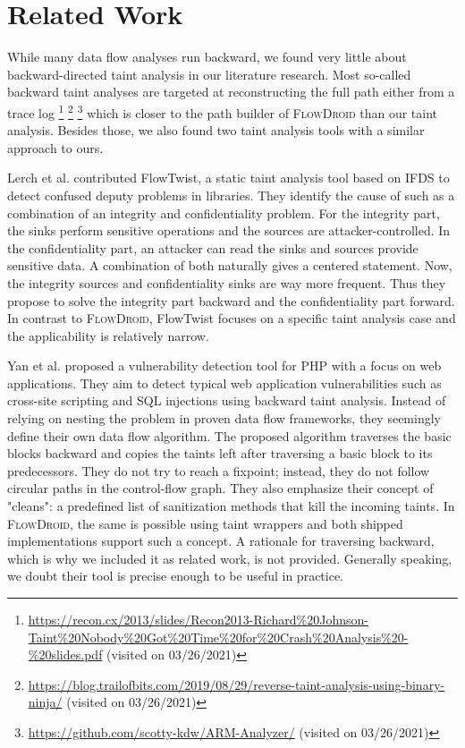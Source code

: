 \documentclass[../draft.tex]{subfiles}
\begin{document}
    \chapter{Related Work}
    While many data flow analyses run backward, we found very little about backward-directed taint analysis in our literature research. 
    Most so-called backward taint analyses are targeted at reconstructing the full path either from a trace log%
    \footnote{\url{https://recon.cx/2013/slides/Recon2013-Richard\%20Johnson-Taint\%20Nobody\%20Got\%20Time\%20for\%20Crash\%20Analysis\%20-\%20slides.pdf} (visited on 03/26/2021)}%
    \footnote{\url{https://blog.trailofbits.com/2019/08/29/reverse-taint-analysis-using-binary-ninja/} (visited on 03/26/2021)}%
    \footnote{\url{https://github.com/scotty-kdw/ARM-Analyzer/} (visited on 03/26/2021)} which is closer to the path builder of \textsc{FlowDroid} than our taint analysis.
    Besides those, we also found two taint analysis tools with a similar approach to ours.

    Lerch et al.\cite{Lerch2014} contributed FlowTwist, a static taint analysis tool based on IFDS to detect confused deputy problems\footnotemark{} in libraries.
      They identify the cause of such as a combination of an integrity and confidentiality problem. 
    For the integrity part, the sinks perform sensitive operations and the sources are attacker-controlled. 
    In the confidentiality part, an attacker can read the sinks and sources provide sensitive data.
    A combination of both naturally gives a centered statement. 
    Now, the integrity sources and confidentiality sinks are way more frequent. 
    Thus they propose to solve the integrity part backward and the confidentiality part forward. 
    In contrast to \textsc{FlowDroid}, FlowTwist focuses on a specific taint analysis case and the applicability is relatively narrow. 

    Yan et al.\cite{Yan2017} proposed a vulnerability detection tool for PHP with a focus on web applications. They aim to detect typical web application vulnerabilities such as cross-site scripting and SQL injections using backward taint analysis. 
    Instead of relying on nesting the problem in proven data flow frameworks, they seemingly define their own data flow algorithm. The proposed algorithm traverses the basic blocks backward and copies the taints left after traversing a basic block to its predecessors. They do not try to reach a fixpoint; instead, they do not follow circular paths in the control-flow graph.
    They also emphasize their concept of "cleans": a predefined list of sanitization methods that kill the incoming taints. 
    In \textsc{FlowDroid}, the same is possible using taint wrappers and both shipped implementations support such a concept.
    A rationale for traversing backward, which is why we included it as related work, is not provided. Generally speaking, we doubt their tool is precise enough to be useful in practice.
\end{document}
